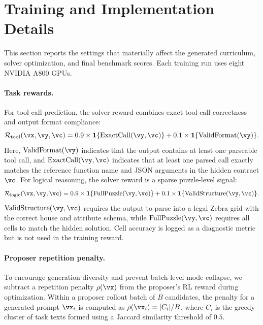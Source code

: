 \section{Training and Implementation Details}
\label{app:training_details}

This section reports the settings that materially affect the generated curriculum, solver optimization, and final benchmark scores. Each training run uses eight NVIDIA A800 GPUs.

\paragraph{Task rewards.}
For tool-call prediction, the solver reward combines exact tool-call correctness and output format compliance:
\begin{equation}
    \mathcal{R}_{\mathrm{tool}}(\vx,\vy,\vc)
    =
    0.9 \times \mathbf{1}\{\mathrm{ExactCall}(\vy,\vc)\}
    +
    0.1 \times \mathbf{1}\{\mathrm{ValidFormat}(\vy)\}.
    \label{eq:tool_reward}
\end{equation}
Here, $\mathrm{ValidFormat}(\vy)$ indicates that the output contains at least one parseable tool call, and $\mathrm{ExactCall}(\vy,\vc)$ indicates that at least one parsed call exactly matches the reference function name and JSON arguments in the hidden contract $\vc$.
For logical reasoning, the solver reward is a sparse puzzle-level signal:
\begin{equation}
    \mathcal{R}_{\mathrm{logic}}(\vx,\vy,\vc)
    =
    0.9 \times \mathbf{1}\{\mathrm{FullPuzzle}(\vy,\vc)\}
    +
    0.1 \times \mathbf{1}\{\mathrm{ValidStructure}(\vy,\vc)\}.
    \label{eq:logic_reward}
\end{equation}
$\mathrm{ValidStructure}(\vy,\vc)$ requires the output to parse into a legal Zebra grid with the correct house and attribute schema, while $\mathrm{FullPuzzle}(\vy,\vc)$ requires all cells to match the hidden solution.
Cell accuracy is logged as a diagnostic metric but is not used in the training reward.

\paragraph{Proposer repetition penalty.}
To encourage generation diversity and prevent batch-level mode collapse, we subtract a repetition penalty $\rho(\vx)$ from the proposer's RL reward during optimization. Within a proposer rollout batch of $B$ candidates, the penalty for a generated prompt $\vx_i$ is computed as $\rho(\vx_i)=|C_i|/B$, where $C_i$ is the greedy cluster of task texts formed using a Jaccard similarity threshold of $0.5$.

